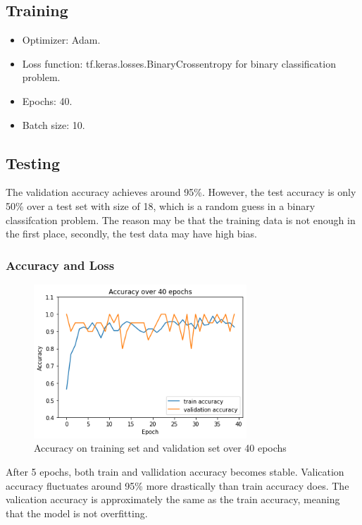 \documentclass[a4paper,10pt]{article}
\begin{document}
\subsection{Training}
\begin{itemize}
  \item Optimizer: Adam.
  \item Loss function: tf.keras.losses.BinaryCrossentropy for binary classification problem.
  \item Epochs: 40.
  \item Batch size: 10.
\end{itemize}

\subsection{Testing}

The validation accuracy achieves around 95\%. 
However, the test accuracy is only 50\% over a test set with size of 18, 
which is a random guess in a binary classifcation problem. 
The reason may be that the training data is not enough in the first place, 
secondly, the test data may have high bias.

\subsubsection{Accuracy and Loss}
\begin{figure}[H]
  \centering
  \includegraphics[width=8cm]{./images/task1-accuracy.png}
     \caption{Accuracy on training set and validation set over 40 epochs}
        \label{task1-accuracy}
\end{figure}

After 5 epochs, both train and vallidation accuracy becomes stable. 
Valication accuracy fluctuates around 95\% more drastically than train accuracy does.
The valication accuracy is approximately the same as the train accuracy, 
meaning that the model is not overfitting.
\end{document}
